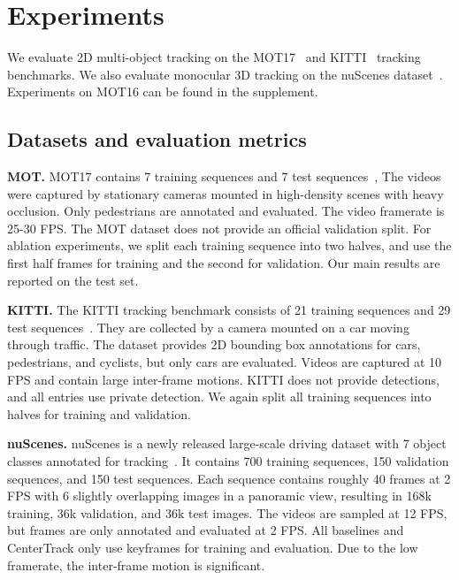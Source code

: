\documentclass[runningheads]{llncs}
\newcommand{\lblsec}[1]{\label{sec:#1}}
\renewcommand{\paragraph}[1]{\noindent\textbf{#1}}
\begin{document}
\section{Experiments}

We evaluate 2D multi-object tracking on the MOT17~\cite{MOT16} and KITTI~\cite{Geiger2012CVPR} tracking benchmarks. We also evaluate monocular 3D tracking on the nuScenes dataset~\cite{nuscenes2019}. Experiments on MOT16 can be found in the supplement.

\subsection{Datasets and evaluation metrics}
\lblsec{datasets}
\paragraph{MOT.}
MOT17 contains 7 training sequences and 7 test sequences~\cite{MOT16},
The videos were captured by stationary cameras mounted in high-density scenes with heavy occlusion.
Only pedestrians are annotated and evaluated.
The video framerate is 25-30 FPS.
The MOT dataset does not provide an official validation split.
For ablation experiments, we split each training sequence into two halves, and use the first half frames for training and the second for validation.
Our main results are reported on the test set.


\paragraph{KITTI.}
The KITTI tracking benchmark consists of 21 training sequences and 29 test sequences~\cite{Geiger2012CVPR}. 
They are collected by a camera mounted on a car moving through traffic. The dataset provides 2D bounding box annotations for cars, pedestrians, and cyclists, but only cars are evaluated. 
Videos are captured at 10 FPS and contain large inter-frame motions.
KITTI does not provide detections, and all entries use private detection.
We again split all training sequences into halves for training and validation.


\paragraph{nuScenes.} nuScenes is a newly released large-scale driving dataset with 7 object classes annotated for tracking~\cite{nuscenes2019}.
It contains 700 training sequences, 150 validation sequences, and 150 test sequences. 
Each sequence contains roughly 40 frames at 2 FPS with 6 slightly overlapping images in a panoramic  view, resulting in 168k training, 36k validation, and 36k test images.
The videos are sampled at 12 FPS, but frames are only annotated and evaluated at 2 FPS.
All baselines and CenterTrack only use keyframes for training and evaluation. Due to the low framerate, the inter-frame motion is significant.
\end{document}
